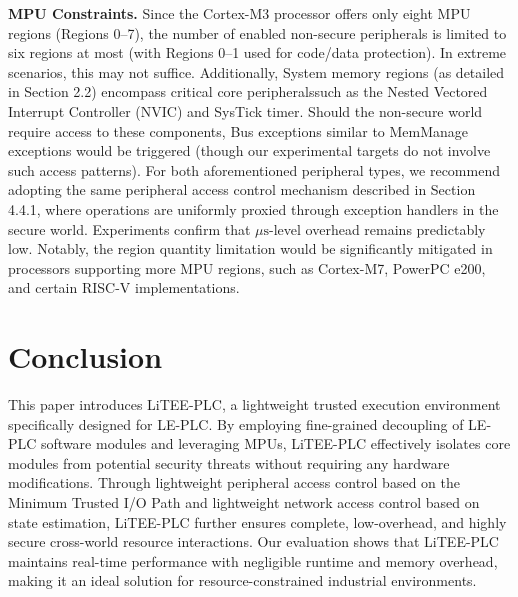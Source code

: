 \documentclass[sigconf]{acmart}
\begin{document}
\textbf{MPU Constraints.}  Since the Cortex-M3 processor offers only eight MPU regions (Regions 0–7), the number of enabled non-secure peripherals is limited to six regions at most (with Regions 0–1 used for code/data protection). In extreme scenarios, this may not suffice. Additionally, System memory regions (as detailed in Section 2.2) encompass critical core peripherals\cite{zhou2022opec}such as the Nested Vectored Interrupt Controller (NVIC) and SysTick timer. Should the non-secure world require access to these components, Bus exceptions similar to MemManage exceptions would be triggered (though our experimental targets do not involve such access patterns).  For both aforementioned peripheral types, we recommend adopting the same peripheral access control mechanism described in Section 4.4.1, where operations are uniformly proxied through exception handlers in the secure world.  Experiments confirm that $\mu\mathrm{s}$-level overhead remains predictably low. Notably, the region quantity limitation would be significantly mitigated in processors supporting more MPU regions, such as Cortex-M7\cite{mpu-7}, PowerPC e200\cite{powerpc}, and certain RISC-V implementations\cite{risc-v}.



\section{Conclusion}
\label{chap9}
This paper introduces LiTEE-PLC, a lightweight trusted execution environment specifically designed for LE-PLC. By employing fine-grained decoupling of LE-PLC software modules and leveraging MPUs, LiTEE-PLC effectively isolates core modules from potential security threats without requiring any hardware modifications. Through lightweight peripheral access control based on the Minimum Trusted I/O Path and lightweight network access control based on state estimation, LiTEE-PLC further ensures complete, low-overhead, and highly secure cross-world resource interactions. Our evaluation shows that LiTEE-PLC maintains real-time performance with negligible runtime and memory overhead, making it an ideal solution for resource-constrained industrial environments.




\end{document}
